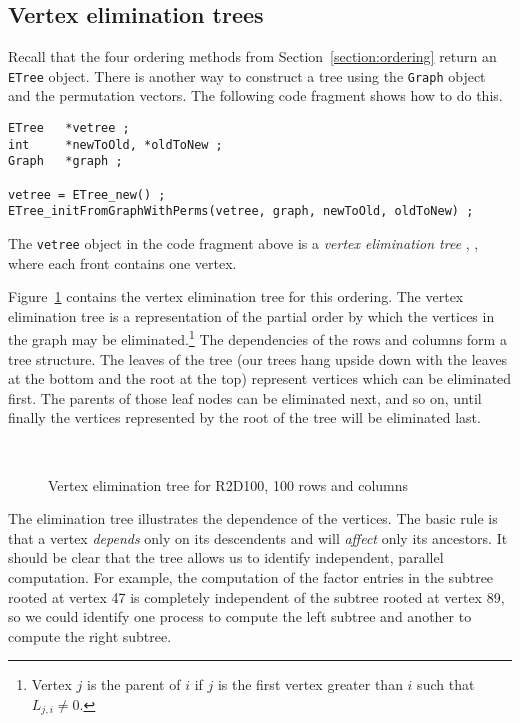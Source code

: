 \subsection{Vertex elimination trees}
\label{subsection:vtx-elim}
\par
Recall that the four ordering methods from
Section~\ref{section:ordering} return an {\tt ETree} object.
There is another way to construct a tree using the {\tt Graph} object
and the permutation vectors.
The following code fragment shows how to do this.
\begin{verbatim}
ETree   *vetree ;
int     *newToOld, *oldToNew ;
Graph   *graph ;

vetree = ETree_new() ;
ETree_initFromGraphWithPerms(vetree, graph, newToOld, oldToNew) ;
\end{verbatim}
The {\tt vetree} object in the code fragment above is a
{\it vertex elimination tree} 
\cite{liu90-etree}, \cite{sch82-etree},
where each front contains one vertex.
\par
Figure~\ref{fig:R2D100-tree-vtx} contains the vertex elimination tree 
for this ordering.
The vertex elimination tree is
a representation of the partial order by which 
the vertices in the graph may be eliminated.\footnote{
Vertex $j$ is the parent of $i$ if $j$ is the first vertex greater
than $i$ such that $L_{j,i} \ne 0$.
}
The dependencies of the rows and columns form a tree structure.  
The leaves of the tree (our trees hang 
upside down with the leaves at the bottom and the root at the top)
represent vertices which can be eliminated first.  
The parents of those leaf nodes can be eliminated next, 
and so on, until finally the vertices represented 
by the root of the tree will be eliminated last.
\par
\begin{figure}[htbp]
\caption{Vertex elimination tree for R2D100, 100 rows and columns}
\label{fig:R2D100-tree-vtx}
\begin{center}
\mbox{
}
\end{center}
\end{figure}
\par
The elimination tree illustrates the dependence of the vertices.
The basic  rule is that a vertex {\it depends} only on its descendents
and will {\it affect} only its ancestors.
It should be clear that the tree allows us to identify independent,
parallel computation.
For example, the computation of the factor entries in the 
subtree rooted at vertex 47 is completely independent of the
subtree rooted at vertex 89, so we could identify one process to
compute the left subtree and another to compute the right subtree.
\par
